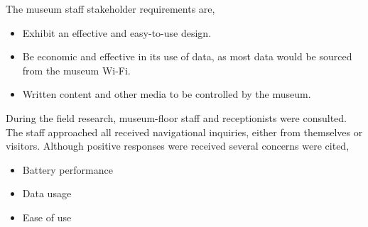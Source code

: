 {The museum staff stakeholder requirements are,
\begin{itemize}
    \item Exhibit an effective and easy-to-use design. 
    \item Be economic and effective in its use of data, as most data would be sourced from the museum Wi-Fi. 
    \item Written content and other media to be controlled by the museum.
\end{itemize}

During the field research, museum-floor staff and receptionists were consulted. The staff approached all received navigational inquiries, either from themselves or visitors. Although positive responses were received several concerns were cited,
\begin{itemize}
    \item Battery performance
    \item Data usage
    \item Ease of use
\end{itemize}

}
